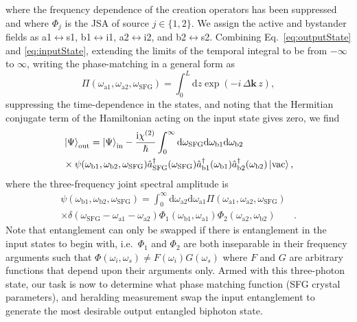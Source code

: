 \documentclass[twocolumn,amssymb, nobibnotes, showpacs, aps, pra,10pt]{revtex4-1}
\newcommand*{\abone}{\hat{a}_{\textrm{b}1}}
\newcommand*{\abtwo}{\hat{a}_{\textrm{b}2}}
\newcommand*{\wi}{\omega_{i}}
\newcommand*{\ws}{\omega_{s}}
\newcommand*{\waone}{\omega_{\textrm{a}1}}
\newcommand*{\watwo}{\omega_{\textrm{a}2}}
\newcommand*{\wbone}{\omega_{\textrm{b}1}}
\newcommand*{\wbtwo}{\omega_{\textrm{b}2}}
\newcommand*{\wsfg}{\omega_\textrm{SFG}}
\newcommand*{\asfg}{\hat{a}_\textrm{SFG}}
\newcommand*{\vacuum}{\ket{\textrm{vac}}}
\newcommand*{\ii}{\mathrm{i}}
\newcommand*{\ie}{i.e.\ }
\begin{document}
where the frequency dependence of the creation operators has been suppressed and where $\Phi_j$ is the JSA of source $j \in \{1,2\}$. We assign the active and bystander fields as a1$\leftrightarrow$s1, b1$\leftrightarrow$i1, a2$\leftrightarrow$i2, and b2$\leftrightarrow$s2. Combining Eq.~\eqref{eq:outputState} and \eqref{eq:inputState}, extending the limits of the temporal integral to be from $-\infty$ to $\infty$, writing the phase-matching in a general form as
\begin{equation}
\Pi(\waone,\watwo,\wsfg) = \int_{0}^{L} \text{d}z \exp \left( -i \, \Delta \mathbf{k} \, z \right),
\end{equation}
suppressing the time-dependence in the states, and noting that the Hermitian conjugate term of the Hamiltonian acting on the input state gives zero, we find
\begin{equation}
\begin{split} \label{eq:threeFreqState}
&\ket{\Psi}_\text{out}= \ket{\Psi}_\text{in}-\frac{\ii \chi^{(2)}}{\hslash} 
\int_0^\infty \text{d}\wsfg\text{d}\wbone \text{d}\wbtwo\\
&\times \psi(\wbone,\wbtwo,\wsfg) \asfg^\dagger(\wsfg)\abone^\dagger(\wbone)\abtwo^\dagger(\wbtwo)\vacuum,
\end{split}
\end{equation}
where the three-frequency joint spectral amplitude is
\begin{equation} \label{eq:psi}
\begin{split}
\psi(\wbone,\wbtwo,\wsfg)= \int_0^\infty  \text{d}\watwo \text{d}\waone  \Pi(\waone, \watwo, \wsfg)& \\
\times \delta(\wsfg - \waone - \watwo) \Phi_1(\wbone,\waone)\Phi_2(\watwo,\wbtwo)&.
\end{split}
\end{equation}
Note that entanglement can only be swapped if there is entanglement in the input states to begin with, \ie $\Phi_1$ and $\Phi_2$ are both inseparable in their frequency arguments such that $\Phi(\wi,\ws) \neq F(\wi) G(\ws)$ where $F$ and $G$ are arbitrary functions that depend upon their arguments only. Armed with this three-photon state, our task is now to determine what phase matching function (SFG crystal parameters), and heralding measurement swap the input entanglement to generate the most desirable output entangled biphoton state.
\end{document}
